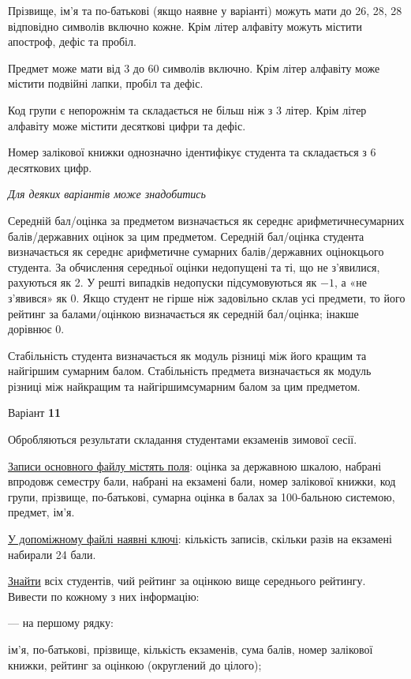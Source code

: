 \documentclass[11pt, ukrainian]{article}
\begin{document}
Прізвище, ім’я та по-батькові (якщо наявне у варіанті) можуть мати до 26, 28, 28 відповідно символів включно кожне. 
Крім літер алфавіту можуть містити апостроф, дефіс та пробіл.

Предмет може мати від 3 до 60 символів включно. 
Крім літер алфавіту може містити подвійні лапки, пробіл та дефіс.

Код групи є непорожнім та складається не більш ніж з 3 літер. 
Крім літер алфавіту може містити десяткові цифри та дефіс.


Номер залікової книжки однозначно ідентифікує студента та складається з 6 десяткових цифр. 

\bigskip\textit{Для деяких варіантів може знадобитись}

Середній бал/оцінка за предметом визначається як середнє арифметичнесумарних балів/державних оцінок за цим предметом. 
Середній бал/оцінка студента визначається як середнє арифметичне сумарних балів/державних оцінокцього студента. 
За обчислення середньої оцінки недопущені та ті, що не з’явилися, рахуються як 2.
У решті випадків недопуски підсумовуються як $-1$, а «не з’явився» як 0.
Якщо студент не гірше ніж задовільно склав усі предмети, 
то його рейтинг за балами/оцінкою визначається як середній бал/оцінка; інакше дорівнює 0.

Стабільність студента визначається як модуль різниці між його кращим та найгіршим сумарним балом.
Стабільність предмета визначається як модуль різниці між найкращим та найгіршимсумарним балом за цим предметом.




\par
\newpage
{\center Варіант  \No \textbf { 11 }\par}
\bigskip
Обробляються результати складання студентами екзаменів зимової сесії.

\underline{Записи основного файлу містять поля}: оцінка за державною шкалою, набрані впродовж семестру бали, набрані на екзамені бали, номер залікової книжки, код групи, прізвище, по-батькові, сумарна оцінка в балах за 100-бальною системою, предмет, ім’я.

\underline{У допоміжному файлі наявні ключі}: кількість записів, скільки разів на екзамені набирали 24 бали.

\underline{Знайти} всіх студентів, чий рейтинг за оцінкою вище середнього рейтингу. Вивести по кожному з них інформацію:\par
{\noindent}--- на першому рядку:\par
ім’я, по-батькові, прізвище, кількість екзаменів, сума балів, номер залікової книжки, рейтинг за оцінкою (округлений до цілого);
\end{document}
